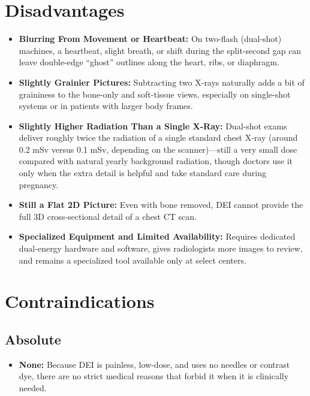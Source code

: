 \section{Disadvantages}
\begin{itemize}
    \item \textbf{Blurring From Movement or Heartbeat:} On two-flash (dual-shot) machines, a heartbeat, slight breath, or shift during the split-second gap can leave double-edge ``ghost'' outlines along the heart, ribs, or diaphragm.
    \item \textbf{Slightly Grainier Pictures:} Subtracting two X-rays naturally adds a bit of graininess to the bone-only and soft-tissue views, especially on single-shot systems or in patients with larger body frames.
    \item \textbf{Slightly Higher Radiation Than a Single X-Ray:} Dual-shot exams deliver roughly twice the radiation of a single standard chest X-ray (around 0.2 mSv versus 0.1 mSv, depending on the scanner)---still a very small dose compared with natural yearly background radiation, though doctors use it only when the extra detail is helpful and take standard care during pregnancy.
    \item \textbf{Still a Flat 2D Picture:} Even with bone removed, DEI cannot provide the full 3D cross-sectional detail of a chest CT scan.
    \item \textbf{Specialized Equipment and Limited Availability:} Requires dedicated dual-energy hardware and software, gives radiologists more images to review, and remains a specialized tool available only at select centers.
\end{itemize}

\section{Contraindications}

\subsection{Absolute}
\begin{itemize}
    \item \textbf{None:} Because DEI is painless, low-dose, and uses no needles or contrast dye, there are no strict medical reasons that forbid it when it is clinically needed.
\end{itemize}


